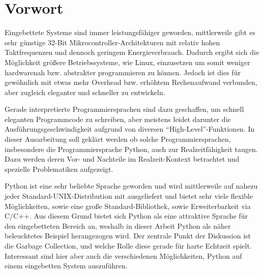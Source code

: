 \section{Vorwort}

Eingebettete Systeme sind immer leistungsfähiger geworden, mittlerweile gibt
es sehr günstige 32-Bit Mikrocontroller-Architekturen mit relativ hohen
Taktfrequenzen und dennoch geringem Energieverbrauch. Dadurch ergibt sich die
Möglichkeit größere Betriebssysteme, wie Linux, einzusetzen um somit weniger
hardwarenah bzw. abstrakter programmieren zu können. Jedoch ist dies für
gewöhnlich mit etwas mehr Overhead bzw. erhöhtem Rechenaufwand verbunden,
aber zugleich eleganter und schneller zu entwickeln.

Gerade interpretierte Programmiersprachen sind dazu geschaffen, um schnell
eleganten Programmcode zu schreiben, aber meistens leidet darunter die
Aus\-führ\-ungs\-gesch\-windig\-keit aufgrund von diversen “High-Level”-Funktionen. In
dieser Ausarbeitung soll geklärt werden ob solche Programmiersprachen,
insbesondere die Programmiersprache Python, auch zur Realzeitfähigkeit taugen.
Dazu werden deren Vor- und Nachteile im Realzeit-Kontext betrachtet und
spezielle Problematiken aufgezeigt.


Python ist eine sehr beliebte Sprache geworden und wird mittlerweile auf
nahezu jeder Standard-UNIX-Distribution mit ausgeliefert und bietet sehr
viele flexible Möglichkeiten, sowie eine große Standard-Bibliothek, sowie
Erweiterbarkeit via C/C++. Aus diesem Grund bietet sich Python als eine
attraktive Sprache für den eingebetteten Bereich an, weshalb in dieser Arbeit
Python als näher beleuchtetes Beispiel herangezogen wird. Der zentrale Punkt
der Diskussion ist die Garbage Collection, und welche Rolle diese gerade für
harte Echtzeit spielt.
Interessant sind hier aber auch die verschiedenen Möglichkeiten, Python auf
einem eingebetten System auszuführen.
